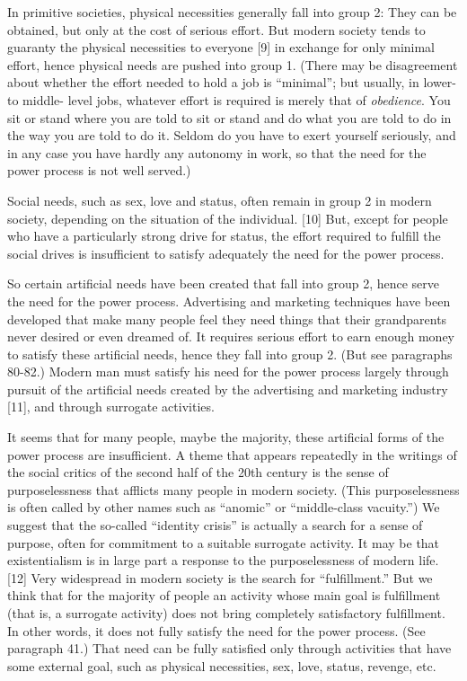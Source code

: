  In primitive societies, physical necessities generally fall into group 2: They can be obtained, but only at the cost of serious effort. But modern society tends to guaranty the physical necessities to everyone [9] in exchange for only minimal effort, hence physical needs are pushed into group 1. (There may be disagreement about whether the effort needed to hold a job is “minimal”; but usually, in lower- to middle- level jobs, whatever effort is required is merely that of {\em obedience}. You sit or stand where you are told to sit or stand and do what you are told to do in the way you are told to do it. Seldom do you have to exert yourself seriously, and in any case you have hardly any autonomy in work, so that the need for the power process is not well served.)

 Social needs, such as sex, love and status, often remain in group 2 in modern society, depending on the situation of the individual. [10] But, except for people who have a particularly strong drive for status, the effort required to fulfill the social drives is insufficient to satisfy adequately the need for the power process.

 So certain artificial needs have been created that fall into group 2, hence serve the need for the power process. Advertising and marketing techniques have been developed that make many people feel they need things that their grandparents never desired or even dreamed of. It requires serious effort to earn enough money to satisfy these artificial needs, hence they fall into group 2. (But see paragraphs 80-82.) Modern man must satisfy his need for the power process largely through pursuit of the artificial needs created by the advertising and marketing industry [11], and through surrogate activities.

 It seems that for many people, maybe the majority, these artificial forms of the power process are insufficient. A theme that appears repeatedly in the writings of the social critics of the second half of the 20th century is the sense of purposelessness that afflicts many people in modern society. (This purposelessness is often called by other names such as “anomic” or “middle-class vacuity.”) We suggest that the so-called “identity crisis” is actually a search for a sense of purpose, often for commitment to a suitable surrogate activity. It may be that existentialism is in large part a response to the purposelessness of modern life. [12] Very widespread in modern society is the search for “fulfillment.” But we think that for the majority of people an activity whose main goal is fulfillment (that is, a surrogate activity) does not bring completely satisfactory fulfillment. In other words, it does not fully satisfy the need for the power process. (See paragraph 41.) That need can be fully satisfied only through activities that have some external goal, such as physical necessities, sex, love, status, revenge, etc.

